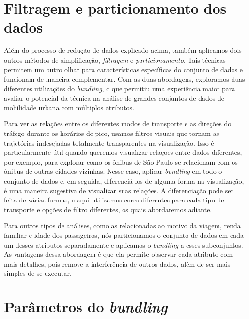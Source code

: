 \section{Filtragem e particionamento dos dados}

Além do processo de redução de dados explicado acima, também aplicamos dois
outros métodos de simplificação, \emph{filtragem} e \emph{particionamento}. Tais
técnicas permitem um outro olhar para características específicas do conjunto de
dados e funcionam de maneira complementar. Com as duas abordagens,
exploramos duas diferentes utilizações do \emph{bundling}, o que permitiu uma
experiência maior para avaliar o potencial da técnica na análise
de grandes conjuntos de dados de mobilidade urbana com múltiplos atributos.

Para ver as relações entre os diferentes modos de transporte e as direções do
tráfego durante os horários de pico, usamos filtros visuais que tornam as
trajetórias indesejadas totalmente transparentes na visualização. Isso é
particularmente útil quando queremos visualizar relações entre dados diferentes,
por exemplo, para explorar como os ônibus de São Paulo se relacionam com os
ônibus de outras cidades vizinhas. Nesse caso, aplicar \emph{bundling} em todo o
conjunto de dados e, em seguida, diferenciá-los de alguma forma na visualização,
é uma maneira sugestiva de visualizar suas relações. A diferenciação pode ser
feita de várias formas, e aqui utilizamos cores diferentes para cada tipo de
transporte e opções de filtro diferentes, os quais abordaremos adiante.

Para outros tipos de análises, como as relacionadas ao motivo da viagem, renda
familiar e idade dos passageiros, nós particionamos o conjunto de dados em cada
um desses atributos separadamente e aplicamos o \emph{bundling} a esses
subconjuntos. As vantagens dessa abordagem é que ela permite observar cada
atributo com mais detalhes, pois remove a interferência de outros dados, além de
ser mais simples de se executar.

\section{Parâmetros do \emph{bundling}}

